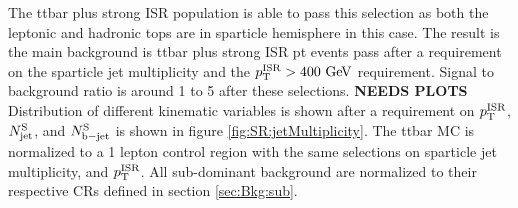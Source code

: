 \indent The ttbar plus strong ISR population is able to pass this selection as both the leptonic and hadronic tops are in sparticle hemisphere in this case.  The result is the main background is ttbar plus strong ISR pt events pass after a requirement on the sparticle jet multiplicity and the $\pTISR > 400 \GeV$ requirement.  Signal to background ratio is around 1 to 5 after these selections.  {\bf NEEDS PLOTS}\\

\indent Distribution of different kinematic variables is shown after a requirement on $p_{\mathrm{T}}^{\mathrm{ISR}}$, $N_{\mathrm{jet}}^{\mathrm{S}}$, and $N_{\mathrm{b-jet}}^{\mathrm{S}}$ is shown in figure \ref{fig:SR:jetMultiplicity}. The ttbar MC is normalized to a 1 lepton control region with the same selections on sparticle jet multiplicity, and $p_{\mathrm{T}}^{\mathrm{ISR}}$.  All sub-dominant background are normalized to their respective CRs defined in section \ref{sec:Bkg:sub}.\\

